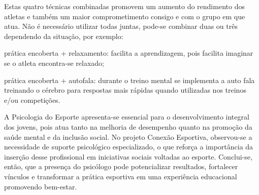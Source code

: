 \begin{Desenvolvimento}
Estas quatro técnicas combinadas promovem um aumento do rendimento dos atletas e também um maior comprometimento consigo e com o grupo em que atua. Não é necessário utilizar todas juntas, pode-se combinar duas ou três dependendo da situação, por exemplo:
\begin{alinea}
  \item prática encoberta + relaxamento: facilita a aprendizagem, pois facilita imaginar se o atleta encontra-se relaxado;
  \item prática encoberta + autofala: durante o treino mental se implementa a auto fala treinando o cérebro para respostas mais rápidas quando utilizadas nos treinos e/ou competições.
\end{alinea}

A Psicologia do Esporte apresenta-se essencial para o desenvolvimento integral dos jovens, pois atua tanto na melhoria de desempenho quanto na promoção da saúde mental e da inclusão social. No projeto Conexão Esportiva, observou-se a necessidade de suporte psicológico especializado, o que reforça a importância da inserção desse profissional em iniciativas sociais voltadas ao esporte. Conclui-se, então, que a presença do psicólogo pode potencializar resultados, fortalecer vínculos e transformar a prática esportiva em uma experiência educacional promovendo bem-estar.

\end{Desenvolvimento}


